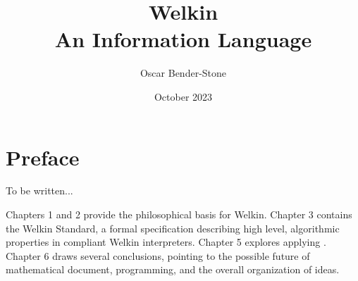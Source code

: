 \documentclass[leqno, oneside]{book}
\title{Welkin \\
  An Information Language}
\author{Oscar Bender-Stone}
\date{October 2023}
\theoremstyle{definition}
\begin{document}
\maketitle


\chapter*{Preface}

To be written...


Chapters 1 and 2 provide the philosophical basis for Welkin. Chapter 3 contains the Welkin Standard, a formal specification describing high level, algorithmic properties in compliant Welkin interpreters. Chapter 5 explores applying . Chapter 6 draws several conclusions, pointing to the possible future of mathematical document, programming, and the overall organization of ideas.


\mainmatter






\end{document}
